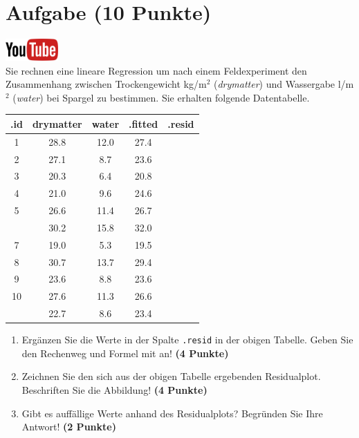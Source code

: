 \documentclass[a4paper, 10pt]{scrartcl}\usepackage[]{graphicx}\usepackage[]{xcolor}
\newenvironment{knitrout}{}{} %
\begin{document}
 
\clearpage

\section{Aufgabe \hfill (10 Punkte)}

\hfill\href{https://youtu.be/dyQlYV9nOqY}{\includegraphics[width =
  2cm]{img/youtube}}\\[1Ex]

Sie rechnen eine lineare Regression um nach einem Feldexperiment den
Zusammenhang zwischen Trockengewicht kg/m$^2$ (\textit{drymatter}) und
Wassergabe l/m$^2$ (\textit{water}) bei Spargel zu bestimmen. Sie erhalten
folgende Datentabelle.

\begin{knitrout}
\color{fgcolor}\begin{table}[!h]
\centering\begingroup\fontsize{12}{14}\selectfont

\begin{tabular}{ccccc}
\toprule
.id & drymatter & water & .fitted & .resid\\
\midrule
1 & 28.8 & 12.0 & 27.4 & \\
2 & 27.1 & 8.7 & 23.6 & \\
3 & 20.3 & 6.4 & 20.8 & \\
4 & 21.0 & 9.6 & 24.6 & \\
5 & 26.6 & 11.4 & 26.7 & \\
\addlinespace
6 & 30.2 & 15.8 & 32.0 & \\
7 & 19.0 & 5.3 & 19.5 & \\
8 & 30.7 & 13.7 & 29.4 & \\
9 & 23.6 & 8.8 & 23.6 & \\
10 & 27.6 & 11.3 & 26.6 & \\
\addlinespace
11 & 22.7 & 8.6 & 23.4 & \\
\bottomrule
\end{tabular}
\endgroup{}
\end{table}

\end{knitrout}

\begin{enumerate}
\item Erg{\"a}nzen Sie die Werte in der Spalte \texttt{.resid} in der obigen
  Tabelle. Geben Sie den Rechenweg und Formel mit an! \textbf{(4 Punkte)}
\item Zeichnen Sie den sich aus der obigen Tabelle ergebenden
  Residualplot. Beschriften Sie die Abbildung! \textbf{(4 Punkte)}
\item Gibt es auff{\"a}llige Werte anhand des Residualplots? Begr{\"u}nden Sie Ihre
  Antwort! \textbf{(2 Punkte)}
\end{enumerate}
 
\end{document}
